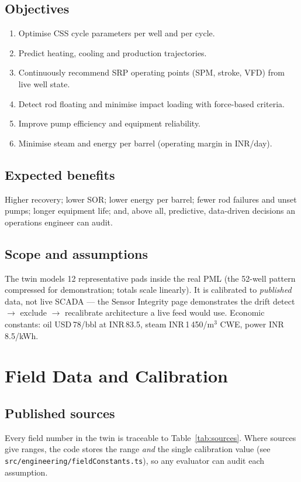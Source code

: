 \documentclass[12pt,a4paper]{report}
\begin{document}
\section{Objectives}
\begin{enumerate}
  \item Optimise CSS cycle parameters per well and per cycle.
  \item Predict heating, cooling and production trajectories.
  \item Continuously recommend SRP operating points (SPM, stroke, VFD) from
    live well state.
  \item Detect rod floating and minimise impact loading with force-based
    criteria.
  \item Improve pump efficiency and equipment reliability.
  \item Minimise steam and energy per barrel (operating margin in INR/day).
\end{enumerate}

\section{Expected benefits}
Higher recovery; lower SOR; lower energy per barrel; fewer rod failures and
unset pumps; longer equipment life; and, above all, predictive, data-driven
decisions an operations engineer can audit.

\section{Scope and assumptions}
The twin models 12 representative pads inside the real PML (the 52-well pattern
compressed for demonstration; totals scale linearly). It is calibrated to
\emph{published} data, not live SCADA --- the Sensor Integrity page
demonstrates the drift detect $\rightarrow$ exclude $\rightarrow$ recalibrate
architecture a live feed would use. Economic constants: oil USD\,78/bbl at
INR\,83.5, steam INR\,1\,450/m$^3$ CWE, power INR\,8.5/kWh.

\chapter{Field Data and Calibration}
\section{Published sources}
Every field number in the twin is traceable to Table~\ref{tab:sources}. Where
sources give ranges, the code stores the range \emph{and} the single
calibration value (see \texttt{src/engineering/fieldConstants.ts}), so any
evaluator can audit each assumption.
\end{document}
